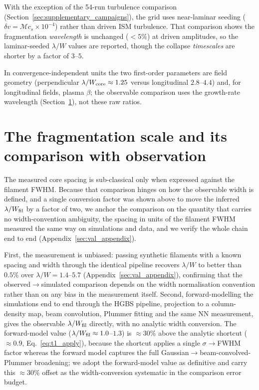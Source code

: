 \documentclass[usenatbib,twoside,twocolumn]{mnras}
\begin{document}
With the exception of the 54-run turbulence comparison (Section~\ref{sec:supplementary_campaigns}), the grid uses near-laminar seeding ($\delta v=\mathcal{M}c_s\times10^{-4}$) rather than driven ISM turbulence. That comparison shows the fragmentation \textit{wavelength} is unchanged ($<5\%$) at driven amplitudes, so the laminar-seeded $\lambda/W$ values are reported, though the collapse \textit{timescales} are shorter by a factor of $3$--$5$.

In convergence-independent units the two first-order parameters are field geometry (perpendicular $\lambda/W_{\rm core}\approx1.25$ versus longitudinal $2.8$--$4.4$) and, for longitudinal fields, plasma $\beta$; the observable comparison uses the growth-rate wavelength (Section~\ref{sec:validation_endtoend}), not these raw ratios.





\section{The fragmentation scale and its comparison with observation}
\label{sec:validation_endtoend}

The measured core spacing is sub-classical only when expressed against the filament FWHM. Because that comparison hinges on how the observable width is defined, and a single conversion factor was shown above to move the inferred $\lambda/W_{\rm fil}$ by a factor of two, we anchor the comparison on the quantity that carries no width-convention ambiguity, the spacing in units of the filament FWHM measured the same way on simulations and data, and we verify the whole chain end to end (Appendix~\ref{sec:val_appendix}).

First, the measurement is unbiased: passing synthetic filaments with a known spacing and width through the identical pipeline recovers $\lambda/W$ to better than $0.5\%$ over $\lambda/W=1.4$--$5.7$ (Appendix~\ref{sec:val_appendix}), confirming that the observed$\to$simulated comparison depends on the width normalisation convention rather than on any bias in the measurement itself. Second, forward-modelling the simulations end to end through the HGBS pipeline, projection to a column-density map, beam convolution, Plummer fitting and the same NN measurement, gives the observable $\lambda/W_{\rm fil}$ directly, with no analytic width conversion. The forward-model value ($\lambda/W_{\rm fil}\approx1.0$--$1.3$) is $\approx30\%$ above the analytic shortcut ($\approx0.9$, Eq.~\ref{eq:t1_apply}), because the shortcut applies a single $\sigma\!\to\!$FWHM factor whereas the forward model captures the full Gaussian$\to$beam-convolved-Plummer broadening; we adopt the forward-model value as definitive and carry this $\approx30\%$ offset as the width-conversion systematic in the comparison error budget.
\end{document}
